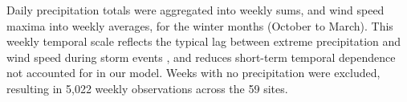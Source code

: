 \documentclass[12pt]{article}
\begin{document}
Daily precipitation totals were aggregated into weekly sums, and wind speed maxima into weekly averages, for the winter months (October to March). 
This weekly temporal scale reflects the typical lag between extreme precipitation and wind speed during storm events \citep{Bengtsson2009}, and reduces short-term temporal dependence not accounted for in our model. 
Weeks with no precipitation were excluded, resulting in 5,022 weekly observations across the 59 sites. 

\end{document}
